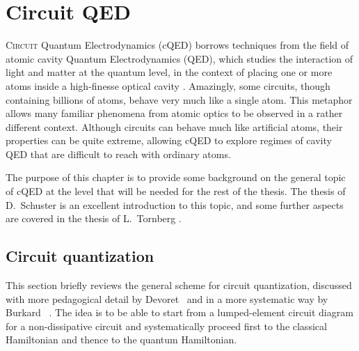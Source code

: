 %
\chapter{Circuit QED}\label{ch:transmon}%
%
%
\lettrine{C}{ircuit} Quantum Electrodynamics (cQED) \cite{schoelkopf_wiring_2008} borrows techniques from the field of atomic cavity Quantum Electrodynamics (QED), which studies the interaction of light and matter at the quantum level, in the context of placing one or more atoms inside a high-finesse optical cavity \cite{haroche_raimond_exploring, walther_cavity_2006}. Amazingly, some circuits, though containing billions of atoms, behave very much like a single atom. This metaphor allows many familiar phenomena from atomic optics to be observed in a rather different context. Although circuits can behave much like artificial atoms, their properties can be quite extreme, allowing cQED to explore regimes of cavity QED that are difficult to reach with ordinary atoms.%

The purpose of this chapter is to provide some background on the general topic of cQED at the level that will be needed for the rest of the thesis. The thesis of D.~Schuster \cite{schuster_thesis} is an excellent introduction to this topic, and some further aspects are covered in the thesis of L.~Tornberg \cite{lars_thesis}.

\section{Circuit quantization}
\label{sec:cctquant}
This section briefly reviews the general scheme for circuit quantization, discussed with more pedagogical detail by Devoret~\cite{devoret_quantum_1997} and in a more systematic way by Burkard \etal~\cite{burkard}. The idea is to be able to start from a lumped-element circuit diagram for a non-dissipative circuit and systematically proceed first to the classical Hamiltonian and thence to the quantum Hamiltonian.

